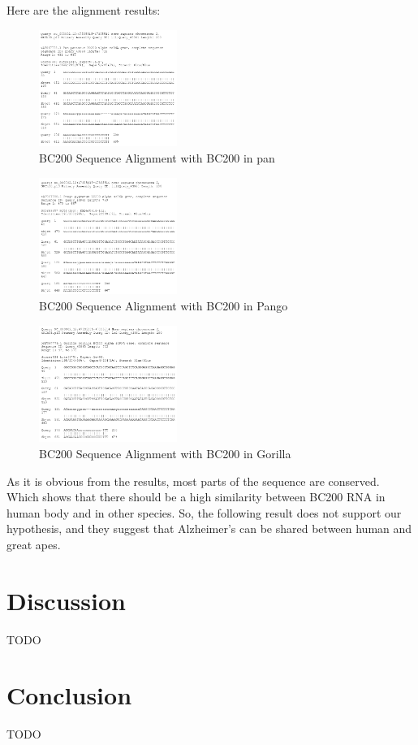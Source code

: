 \documentclass[conference]{IEEEtran}
\begin{document}
Here are the alignment results:
\begin{figure}
  \centering
  \includegraphics[width=0.4\textwidth]{figs/TK1PBYHT114-Alignment-2-page-1.png}
  \caption{BC200 Sequence Alignment with BC200 in pan}
\end{figure}
\begin{figure}
  \centering
  \includegraphics[width=0.4\textwidth]{figs/TK1PBYHT114-Alignment-3-page-1.png}
  \caption{BC200 Sequence Alignment with BC200 in Pango}
\end{figure}
\begin{figure}
  \centering
  \includegraphics[width=0.4\textwidth]{figs/TK1PBYHT114-Alignment-page-1.png}
  \caption{BC200 Sequence Alignment with BC200 in Gorilla}
\end{figure}

As it is obvious from the results, most parts of the sequence are conserved. Which shows that there should be a high similarity between BC200 RNA in human body and in other species. So, the following result does not support our hypothesis, and they suggest that Alzheimer’s can be shared between human and great apes.

\section{Discussion}\label{sec:discussion}
TODO

\section{Conclusion}\label{sec:conclusion}
TODO



\end{document}
